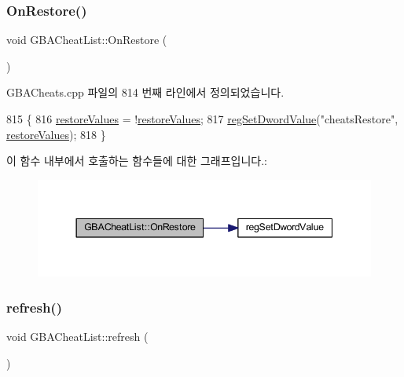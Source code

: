 \subsubsection{\texorpdfstring{On\+Restore()}{OnRestore()}}
{\footnotesize\ttfamily void G\+B\+A\+Cheat\+List\+::\+On\+Restore (\begin{DoxyParamCaption}{ }\end{DoxyParamCaption})\hspace{0.3cm}{\ttfamily [protected]}}



G\+B\+A\+Cheats.\+cpp 파일의 814 번째 라인에서 정의되었습니다.


\begin{DoxyCode}
815 \{
816   \mbox{\hyperlink{class_g_b_a_cheat_list_a5a6fa66317a2fdab0f9880bd2056c1d0}{restoreValues}} = !\mbox{\hyperlink{class_g_b_a_cheat_list_a5a6fa66317a2fdab0f9880bd2056c1d0}{restoreValues}};
817   \mbox{\hyperlink{_reg_8cpp_a758e775489a3fb5c3cc7071fdd5af87e}{regSetDwordValue}}(\textcolor{stringliteral}{"cheatsRestore"}, \mbox{\hyperlink{class_g_b_a_cheat_list_a5a6fa66317a2fdab0f9880bd2056c1d0}{restoreValues}});
818 \}
\end{DoxyCode}
이 함수 내부에서 호출하는 함수들에 대한 그래프입니다.\+:
\nopagebreak
\begin{figure}[H]
\begin{center}
\leavevmode
\includegraphics[width=344pt]{class_g_b_a_cheat_list_a0fe16ba1b246f6baa133926505681012_cgraph}
\end{center}
\end{figure}
\mbox{\label{class_g_b_a_cheat_list_a12928bb674926ae02d5a3ceb156a3b53}} 
\subsubsection{\texorpdfstring{refresh()}{refresh()}}
{\footnotesize\ttfamily void G\+B\+A\+Cheat\+List\+::refresh (\begin{DoxyParamCaption}{ }\end{DoxyParamCaption})}



